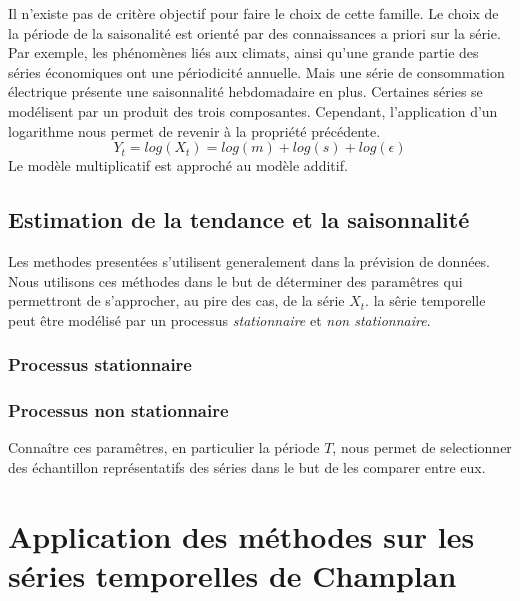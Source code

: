 \documentclass[onecolumn, 12pt]{book}
\begin{document}
Il n'existe pas de crit\`ere objectif pour faire le choix de cette famille. 
\newline
Le choix de la p\'eriode de la saisonalit\'e est orient\'e par des connaissances a priori sur la s\'erie. 
Par exemple, les ph\'enom\`enes li\'es aux climats, ainsi qu'une grande partie des s\'eries \'economiques ont une p\'eriodicit\'e annuelle.
Mais une s\'erie de consommation \'electrique pr\'esente une saisonnalit\'e hebdomadaire en plus.
\newline
Certaines s\'eries se mod\'elisent par un produit des trois composantes. Cependant, l'application d'un logarithme nous permet de revenir \`a la propri\'et\'e pr\'ec\'edente.
\begin{equation}
 Y_t = log(X_t) = log(m) + log(s) + log(\epsilon)
\end{equation}
Le mod\`ele multiplicatif est approch\'e au mod\`ele additif.

\subsection{Estimation de la tendance et la saisonnalit\'e}
Les methodes present\'ees s'utilisent generalement dans la pr\'evision de donn\'ees.
Nous utilisons ces m\'ethodes dans le but de d\'eterminer des param\^etres qui permettront de s'approcher, au pire des cas, de la s\'erie $X_t$.
\newline
la s\^erie temporelle peut \^etre mod\'elis\'e par un processus {\em stationnaire} et {\em non stationnaire}.
\subsubsection{Processus stationnaire}

\subsubsection{Processus non stationnaire}


Conna\^itre ces param\^etres, en particulier la p\'eriode $T$, nous permet de selectionner des \'echantillon repr\'esentatifs des s\'eries dans le but de les comparer entre eux.
\section{Application des m\'ethodes sur les s\'eries temporelles de Champlan}
\end{document}
